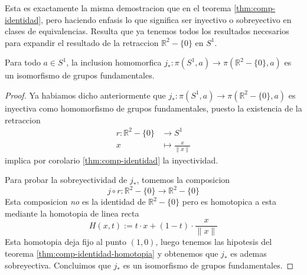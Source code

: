 Esta es exactamente la misma demostracion que en el teorema
\ref{thm:comp-identidad}, pero haciendo enfasis lo que significa ser
inyectivo o sobreyectivo en clases de equivalencias. Resulta que ya
tenemos todos los resultados necesarios para expandir el resultado de la
retraccion \(\mathbb R ^2 - \{0\}\) en \(S^1\).

\begin{teorema}
  Para todo \(a \in S^1\), la inclusion homomorfica \(j_* : \pi (S^1, a)
  \to \pi (\mathbb R ^2 - \{0\}, a)\) es un isomorfismo de grupos
  fundamentales.
\end{teorema}
\begin{proof}
  Ya habiamos dicho anteriormente que \( j_* : \pi (S^1, a) \to \pi
  (\mathbb R ^2 - \{0\}, a)\) es inyectiva como homomorfismo de grupos
  fundamentales, puesto la existencia de la retraccion
  \begin{align*}
    r : \mathbb R ^2 - \{0\} &\to S^1 \\
    x &\mapsto \frac x {\lVert x \rVert}
  \end{align*}
  implica por corolario \ref{thm:comp-identidad} la inyectividad.

  Para probar la sobreyectividad de \(j_*\), tomemos la composicion
  \[ j \circ r : \mathbb R ^2 - \{0\} \to \mathbb R ^2 - \{0\} \]
  Esta composicion \emph{no} es la identidad de \(\mathbb R ^2 - \{0\}
  \) pero es homotopica a esta mediante la homotopia de linea recta
  \[ H(x,t) := t \cdot x + (1 - t) \cdot \frac x {\lVert x \rVert} \]
  Esta homotopia deja fijo al punto \((1,0)\), luego tenemos las
  hipotesis del teorema \ref{thm:comp-identidad-homotopia} y obtenemos
  que \(j_*\) es ademas sobreyectiva. Concluimos que \(j_*\) es un
  isomorfismo de grupos fundamentales.
\end{proof}

